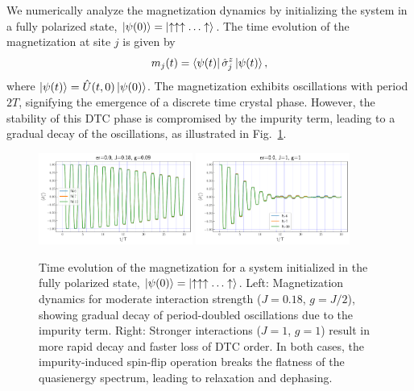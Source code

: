 \documentclass[a4paper, 10pt]{article}
\begin{document}
We numerically analyze the magnetization dynamics by initializing the system in a fully polarized state, $\ket{\psi(0)} = \ket{\uparrow \uparrow \uparrow \ldots \uparrow}$. The time evolution of the magnetization at site $j$ is given by
\begin{align}
    m_j(t) = \bra{\psi(t)} \hat{\sigma}_j^z \ket{\psi(t)},
\end{align}
where $\ket{\psi(t)} = \hat{U}(t,0) \ket{\psi(0)}$. The magnetization exhibits oscillations with period $2T$, signifying the emergence of a discrete time crystal phase. However, the stability of this DTC phase is compromised by the impurity term, leading to a gradual decay of the oscillations, as illustrated in Fig.~\ref{figs:impure_flatband_dtc}.
\begin{figure}[h!]
    \centering
    \includegraphics[width=0.45\textwidth]{figs/mag_er0.0_J0.18_g0.09.pdf}
    \includegraphics[width=0.45\textwidth]{figs/mag_er0.0_J1_g1.pdf}
    \caption{Time evolution of the magnetization for a system initialized in the fully polarized state, $\ket{\psi(0)} = \ket{\uparrow \uparrow \uparrow \ldots \uparrow}$. Left: Magnetization dynamics for moderate interaction strength ($J=0.18$, $g=J/2$), showing gradual decay of period-doubled oscillations due to the impurity term. Right: Stronger interactions ($J=1$, $g=1$) result in more rapid decay and faster loss of DTC order. In both cases, the impurity-induced spin-flip operation breaks the flatness of the quasienergy spectrum, leading to relaxation and dephasing.}
    \label{figs:impure_flatband_dtc}
\end{figure}
\end{document}
